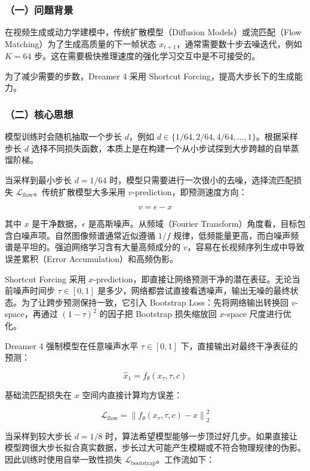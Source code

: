 \hypertarget{ux4e00ux95eeux9898ux80ccux666f-5}{%
\subsubsection{（一）问题背景}\label{ux4e00ux95eeux9898ux80ccux666f-5}}

在视频生成或动力学建模中，传统扩散模型（Diffusion Models）或流匹配（Flow Matching）为了生成高质量的下一帧状态 \(x_{t+1}\)，通常需要数十步去噪迭代，例如 \(K=64\) 步。这在需要极快推理速度的强化学习交互中是不可接受的。

为了减少需要的步数，Dreamer 4 采用 Shortcut Forcing，提高大步长下的生成能力。

\hypertarget{ux4e8cux6838ux5fc3ux601dux60f3-5}{%
\subsubsection{（二）核心思想}\label{ux4e8cux6838ux5fc3ux601dux60f3-5}}

模型训练时会随机抽取一个步长 \(d\)，例如 \(d\in\{1/64,2/64,4/64,\ldots,1\}\)。根据采样步长 \(d\) 选择不同损失函数，本质上是在构建一个从小步试探到大步跨越的自举蒸馏阶梯。

当采样到最小步长 \(d=1/64\) 时，模型只需要进行一次很小的去噪，选择流匹配损失 \(\mathcal{L}_{\mathrm{flow}}\)。传统扩散模型大多采用 \(v\)-prediction，即预测速度方向：

\[
v=\epsilon-x
\]

其中 \(x\) 是干净数据，\(\epsilon\) 是高斯噪声。从频域（Fourier Transform）角度看，目标包含白噪声项。自然图像频谱通常近似遵循 \(1/f\) 规律，低频能量更高，而白噪声频谱是平坦的。强迫网络学习含有大量高频成分的 \(v\)，容易在长视频序列生成中导致误差累积（Error Accumulation）和高频伪影。

Shortcut Forcing 采用 \(x\)-prediction，即直接让网络预测干净的潜在表征。无论当前噪声时间步 \(\tau\in[0,1]\) 是多少，网络都尝试直接看透噪声，输出无噪的最终状态。为了让跨步预测保持一致，它引入 Bootstrap Loss：先将网络输出转换回 \(v\)-space，再通过 \((1-\tau)^2\) 的因子把 Bootstrap 损失缩放回 \(x\)-space 尺度进行优化。

Dreamer 4 强制模型在任意噪声水平 \(\tau\in[0,1]\) 下，直接输出对最终干净表征的预测：

\[
\hat{x}_1=f_\theta(x_\tau,\tau,c)
\]

基础流匹配损失在 \(x\) 空间内直接计算均方误差：

\[
\mathcal{L}_{\mathrm{flow}}=\left\|f_\theta(x_\tau,\tau,c)-x\right\|_2^2
\]

当采样到较大步长 \(d=1/8\) 时，算法希望模型能够一步顶过好几步。如果直接让模型跨很大步长拟合真实数据，步长过大可能产生模糊或不符合物理规律的伪影。因此训练时使用自举一致性损失 \(\mathcal{L}_{\mathrm{bootstrap}}\)。工作流如下：

